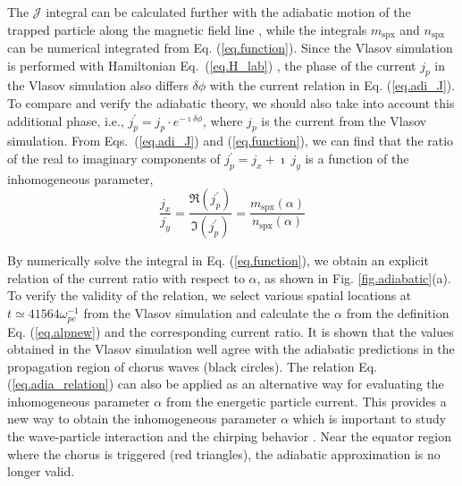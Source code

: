 The $\mathcal{J}$ integral can be calculated further with the adiabatic motion of the trapped particle along the magnetic field line \cite{summers2012}, while the integrals $m_\mathrm{spx}$ and $n_\mathrm{spx}$ can be numerical integrated from Eq. (\ref{eq.function}).
Since the Vlasov simulation is performed with Hamiltonian Eq.~(\ref{eq.H_lab})
\cite{zheng2023b,zheng2024}, the phase of the current $j_p$ in the Vlasov simulation also differs $\delta \phi$ with the current relation in Eq. (\ref{eq.adi_J}).
To compare and verify the adiabatic theory, we should also take into account this additional phase, i.e., $j^\prime_{p} = j_p \cdot e^{-\imath \delta \phi}$, where $j_p$ is the current from the Vlasov simulation. 
From Eqs.~(\ref{eq.adi_J}) and (\ref{eq.function}), we can find that the ratio of the real to imaginary components of $j^\prime_{p}=j_x+\imath~ j_y$ is a function of the inhomogeneous parameter, 
\begin{equation}\label{eq.adia_relation}
\frac{j_x}{j_y} 
= \frac{{\Re}(j^\prime_p)}{{\Im}(j^\prime_p)} 
= \frac{m_\mathrm{spx}(\alpha)}{n_\mathrm{spx}(\alpha)}
\end{equation}

By numerically solve the integral in Eq. (\ref{eq.function}), we obtain an explicit relation of the current ratio with respect to $\alpha$, as shown in Fig. \ref{fig.adiabatic}(a). 
To verify the validity of the relation, we select various spatial locations at $t\simeq41564\omega_{pe}^{-1}$ from the Vlasov simulation \cite{zheng2023b,zheng2024}
and calculate the $\alpha$ from the definition Eq. (\ref{eq.alpnew}) and the corresponding current ratio.
It is shown that the values obtained in the Vlasov simulation  well agree with the adiabatic predictions in the propagation region of chorus waves (black circles).
The  relation 
Eq. (\ref{eq.adia_relation})
can also be applied as an alternative way for evaluating the inhomogeneous parameter $\alpha$ from the energetic particle current.
This provides a new way to obtain the inhomogeneous parameter $\alpha$ which is important to study the wave-particle interaction and the chirping behavior \cite{tao_theoretical_2020,omura2008}.
Near the equator region where the chorus is triggered (red triangles), the adiabatic approximation is no longer valid.

